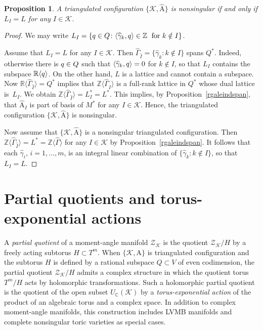 \documentclass[a4paper]{amsart}
\newtheorem{proposition}[theorem]{Proposition}
\theoremstyle{definition}
\theoremstyle{remark}
\numberwithin{equation}{section}
\def\R{\mathbb R}
\def\C{\mathbb C}
\def\R{\mathbb R}
\def\Z{\mathbb Z}
\def\sK{\mathcal K}
\newcommand{\mb}[1]{{\textbf {\textit#1}}}
\newcommand{\zk}{\mathcal Z_{\mathcal K}}
\newcommand{\<}{\langle}
\renewcommand{\>}{\rangle}
\begin{document}
\begin{proposition}\label{nsdual}
A triangulated configuration $\{\sK,\widehat{\mathrm A}\}$ is nonsingular if and only if $L_I=L$ for any $I\in\sK$.
\end{proposition}
\begin{proof}
We may write $L_I=\{\mb q\in Q\colon\langle\widehat\gamma_k,\mb q\rangle\in\Z\;\text{ for }k\notin I\}$. 

Assume that $L_I=L$  for any $I\in\sK$. Then $\widehat\Gamma_{\widehat I}=\{\widehat\gamma_k\colon k\notin I\}$ spans $Q^*$. Indeed, otherwise there is $\mb q\in Q$ such that $\langle\widehat\gamma_k,\mb q\rangle=0$ for $k\notin I$, so that $L_I$ contains the subspace $\R\langle\mb q\rangle$. On the other hand, $L$ is a lattice and cannot contain a subspace. Now $\R\langle\widehat\Gamma_{\widehat I}\rangle=Q^*$ implies that $\Z\langle\widehat\Gamma_{\widehat I}\rangle$ is a full-rank lattice in $Q^*$ whose dual lattice is~$L_I$. We obtain 
$\Z\langle\widehat\Gamma_{\widehat I}\rangle
=L_I^*=L^*$. This implies, by Proposition~\ref{rgaleindspan}, that $\widehat{\mathrm A}_I$ is part of basis of $M^*$ for any $I\in\sK$. Hence, the triangulated configuration $\{\sK,\widehat{\mathrm A}\}$ is nonsingular.

Now assume that $\{\sK,\widehat{\mathrm A}\}$ is a nonsingular triangulated configuration. Then 
$\Z\langle\widehat\Gamma_{\widehat I}\rangle
=L^*=\Z\langle\widehat\Gamma\rangle$ for any $I\in\sK$  by Proposition~\ref{rgaleindspan}. It follows that each $\widehat\gamma_i$, $i=1,\ldots,m$, is an integral linear combination of $\{\widehat\gamma_k\colon k\notin I\}$, so that $L_I=L$.
\end{proof}



\section{Partial quotients and torus-exponential actions}\label{sectea}
A \emph{partial quotient} of a moment-angle manifold $\zk$ is the quotient $\zk/H$ by a freely acting subtorus $H\subset T^m$. When $\{\mathcal K,\mathrm A\}$ is triangulated configuration and the subtorus $H$ is defined by a rational subspace $Q\subset V$ of even codimension, the partial quotient $\zk/H$ admits a complex structure in which the quotient torus $T^m/H$ acts by holomorphic transformations. Such a holomorphic partial quotient is the quotient of the open subset $U_\C(\sK)$ by a \emph{torus-exponential action} of the product of an algebraic torus and a complex space. In addition to complex moment-angle manifolds, this construction includes LVMB manifolds and complete nonsingular toric varieties as special cases.
\end{document}
